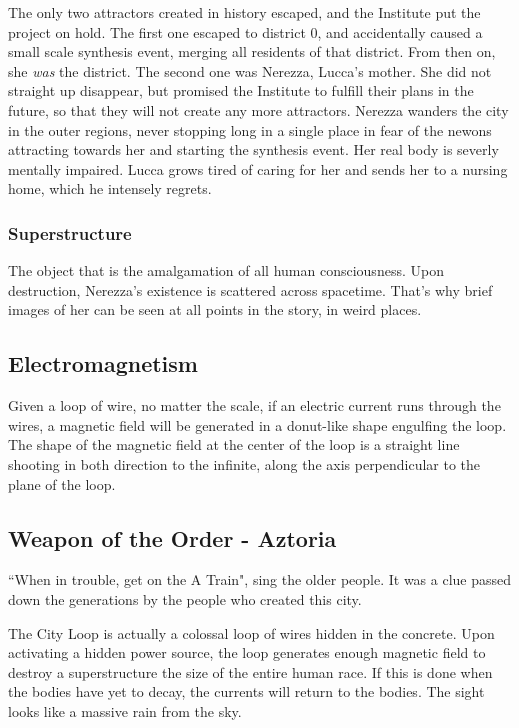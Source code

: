 \documentclass[11pt]{article}
\begin{document}
		The only two attractors created in history escaped, and the Institute put the project on hold. 
		The first one escaped to district 0, and accidentally caused a small scale synthesis event, merging all residents of that district. 
		From then on, she \textit{was} the district.
		The second one was Nerezza, Lucca's mother. She did not straight up disappear, but promised the Institute to fulfill their plans in the future, so that they will not create any more attractors. 
		Nerezza wanders the city in the outer regions, never stopping long in a single place in fear of the newons attracting towards her and starting the synthesis event. 
		Her real body is severly mentally impaired. 
		Lucca grows tired of caring for her and sends her to a nursing home, which he intensely regrets.
		\subsubsection{Superstructure}
		The object that is the amalgamation of all human consciousness. Upon destruction, Nerezza's existence is scattered across spacetime. That's why brief images of her can be seen at all points in the story, in weird places.
		\newpage
	
	\subsection{Electromagnetism}
	Given a loop of wire, no matter the scale, if an electric current runs through the wires, a magnetic field will be generated in a donut-like shape engulfing the loop. 
	The shape of the magnetic field at the center of the loop is a straight line shooting in both direction to the infinite, along the axis perpendicular to the plane of the loop.
	
	\subsection{Weapon of the Order - Aztoria}
	``When in trouble, get on the A Train", sing the older people. 
	It was a clue passed down the generations by the people who created this city. 
	
	The City Loop is actually a colossal loop of wires hidden in the concrete. 
	Upon activating a hidden power source, the loop generates enough magnetic field to destroy a superstructure the size of the entire human race. 
	If this is done when the bodies have yet to decay, the currents will return to the bodies. The sight looks like a massive rain from the sky.
	
\end{document}
